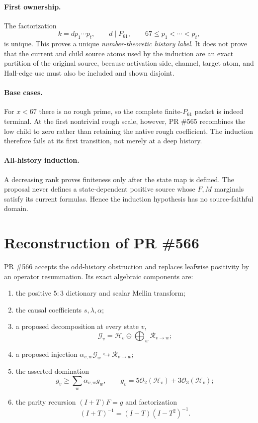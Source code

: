 \documentclass[11pt]{article}
\newcommand{\1}{\mathbf 1}
\newcommand{\Obs}{\mathcal O}
\begin{document}
\paragraph{First ownership.}
The factorization
\[
k=d p_1\cdots p_t,
\qquad d\mid P_{61},
\qquad67\le p_1<\cdots<p_t,
\]
is unique.  This proves a unique \emph{number-theoretic history label}.  It does not prove that the current and child source atoms used by the induction are an exact partition of the original source, because activation side, channel, target atom, and Hall-edge use must also be included and shown disjoint.

\paragraph{Base cases.}
For $x<67$ there is no rough prime, so the complete finite-$P_{61}$ packet is indeed terminal.  At the first nontrivial rough scale, however, PR \#565 recombines the low child to zero rather than retaining the native rough coefficient.  The induction therefore fails at its first transition, not merely at a deep history.

\paragraph{All-history induction.}
A decreasing rank proves finiteness only after the state map is defined.  The proposal never defines a state-dependent positive source whose $F,M$ marginals satisfy its current formulas.  Hence the induction hypothesis has no source-faithful domain.

\section{Reconstruction of PR \#566}

PR \#566 accepts the odd-history obstruction and replaces leafwise positivity by an operator resummation.  Its exact algebraic components are:

\begin{enumerate}[label=\textbf{566.\arabic*.}]
\item the positive $5{:}3$ dictionary and scalar Mellin transform;
\item the causal coefficients $s,\lambda,\alpha$;
\item a proposed decomposition at every state $v$,
\[
\mathcal G_v=\mathcal H_v\oplus\bigoplus_w\mathcal R_{v\to w};
\]
\item a proposed injection $\alpha_{v,w}\mathcal G_w\hookrightarrow\mathcal R_{v\to w}$;
\item the asserted domination
\[
g_v\ge\sum_w\alpha_{v,w}g_w,
\qquad
 g_v=5\Obs_2(\mathcal H_v)+3\Obs_3(\mathcal H_v);
\]
\item the parity recursion $(I+T)F=g$ and factorization
\[
(I+T)^{-1}=(I-T)(I-T^2)^{-1}.
\]
\end{enumerate}
\end{document}
